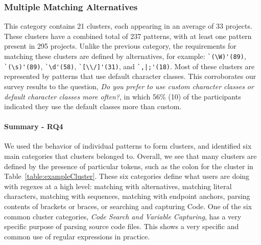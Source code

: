\subsubsection{Multiple Matching Alternatives}
This category contains 21 clusters, each appearing in an average of 33 projects.  These clusters have a combined total of 237 patterns, with at least one pattern present in 295 projects. Unlike the previous category, the requirements for matching these clusters are defined by alternatives, for example:
\verb!`(\W)'(89)!, \verb!`(\s)'(89)!, \verb!`\d'(58)!, \verb!`[\\/]'(31)!, and \verb!`,|;'(18)!.  Most of these clusters are represented by patterns that use default character classes.  This corroborates our survey results to the question, \emph{Do you prefer to use custom character classes or default character classes more often?}, in which 56\% (10) of the participants indicated they use the default classes more than custom.

\paragraph{Summary - RQ4}
We used the behavior of individual patterns to form clusters, and identified six main categories that clusters belonged to.  Overall, we see that many clusters are defined by the presence of particular tokens, such as the colon for the cluster in Table~\ref{table:exampleCluster}.
These six categories define what users are doing with regexes at a high level: matching with alternatives, matching literal characters, matching with sequences, matching with endpoint anchors, parsing contents of brackets or braces, or searching and capturing Code.
One of the six common cluster categories, \emph{Code Search and Variable Capturing}, has a very specific purpose of parsing source code files. This shows a very specific and common use of regular expressions in practice.


%
%
%
%






